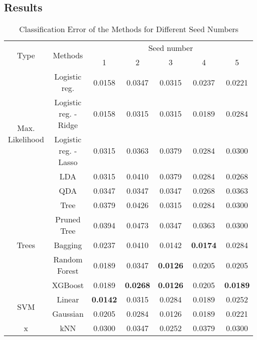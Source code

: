 \subsection{Results}
\begin{table}[htb]
	\caption{Classification Error of the Methods for Different Seed Numbers}
	\begin{center}
		\begin{tabular}{@{} c c c  c c c c @{}}\toprule
			\multirow{2}{*}{Type} & \multirow{2}{*}{Methods} &  \multicolumn{5}{c}{Seed number}\\
			& & 1 & 2 & 3 & 4 & 5 \\
			\midrule
			\multirow{5}{*}{Max. Likelihood} & Logistic reg. & \num{0.0158} & \num{0.0347} & \num{0.0315} & \num{0.0237} & \num{0.0221} \\
			& Logistic reg. - Ridge & \num{0.0158} & \num{0.0315} & \num{0.0315} & \num{0.0189} & \num{0.0284} \\
			& Logistic reg. - Lasso & \num{0.0315} & \num{0.0363} & \num{0.0379} & \num{0.0284} & \num{0.0300} \\
			& LDA & \num{0.0315} & \num{0.0410} & \num{0.0379} & \num{0.0284} & \num{0.0268} \\
			& QDA & \num{0.0347} & \num{0.0347} & \num{0.0347} & \num{0.0268} & \num{0.0363} \\
			\cmidrule{1-7}
			\multirow{5}{*}{Trees} & Tree & \num{0.0379} & \num{0.0426} & \num{0.0315} & \num{0.0284} & \num{0.0300}\\
			& Pruned Tree & \num{0.0394} & \num{0.0473} & \num{0.0347} & \num{0.0363} & \num{0.0300}\\  
			& Bagging & \num{0.0237} & \num{0.0410} & \num{0.0142} & \textbf{\num{0.0174}} & \num{0.0284}\\
			& Random Forest & \num{0.0189} & \num{0.0347} & \textbf{\num{0.0126}} & \num{0.0205} & \num{0.0205}\\
			& XGBoost & \num{0.0189} & \textbf{\num{0.0268}} & \textbf{\num{0.0126}} & \num{0.0205} & \textbf{\num{0.0189}}\\
			\cmidrule{1-7}
			\multirow{2}{*}{SVM} & Linear & \textbf{\num{0.0142}} & \num{0.0315} & \num{0.0284} & \num{0.0189} & \num{0.0252}\\
			& Gaussian & \num{0.0205} & \num{0.0284} & \num{0.0126} & \num{0.0189} & \num{0.0221}\\
			\cmidrule{1-7}
			x & kNN & \num{0.0300} & \num{0.0347} & \num{0.0252} & \num{0.0379} & \num{0.0300}\\
			\bottomrule
			\end{tabular}
			\end{center}
			\label{tab_res_naive}
\end{table}